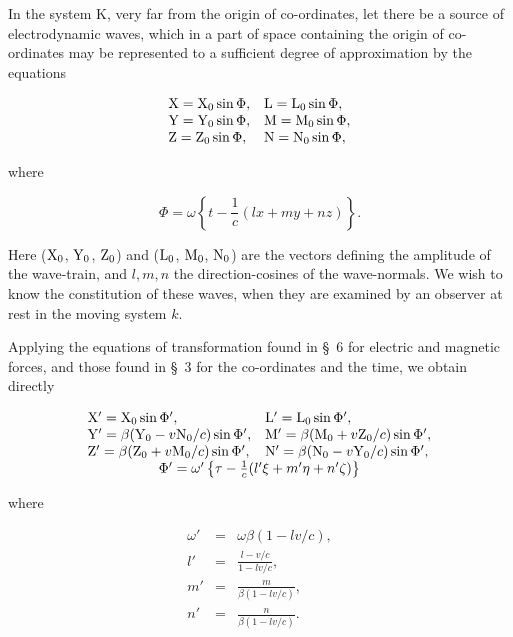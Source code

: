\documentclass{article}
\newcommand{\ic}{\frac{1}{c}}
\begin{document}
In the system K, very far from the origin of co-ordinates, let there
be a source of electrodynamic waves, which in a part of space
containing the origin of co-ordinates may be represented to a
sufficient degree of approximation by the equations

\[
\begin{array}{ll}
{\rm X} = {\rm X}_0\sin\Phi, & {\rm L} = {\rm L}_0\sin\Phi, \\
{\rm Y} = {\rm Y}_0\sin\Phi, & {\rm M} = {\rm M}_0\sin\Phi, \\
{\rm Z} = {\rm Z}_0\sin\Phi, & {\rm N} = {\rm N}_0\sin\Phi, \\
\end{array}
\]

\noindent
where

\[
\Phi=\omega\left\{t-\ic(lx+my+nz)\right\}.
\]

\noindent
Here (${\rm X}_0$, ${\rm Y}_0$, ${\rm Z}_0$)
and (${\rm L}_0$, ${\rm M}_0$, ${\rm N}_0$) are the vectors defining the
amplitude of the wave-train, and $l, m, n$ the direction-cosines of the
wave-normals.  We wish to know the constitution of these waves, when
they are examined by an observer at rest in the moving system $k$.

Applying the equations of transformation found in \S\ 6 for electric and
magnetic forces, and those found in \S\ 3 for the co-ordinates and the
time, we obtain directly

\[
\begin{array}{ll}
{\rm X'} = {\rm X}_0\sin\Phi', & {\rm L'} = {\rm L}_0\sin\Phi', \\
{\rm Y'} = \beta({\rm Y}_0-v{\rm N}_0/c)\sin\Phi', & {\rm M'} = \beta({\rm M}_0+v{\rm Z}_0/c)\sin\Phi', \\
{\rm Z'} = \beta({\rm Z}_0+v{\rm M}_0/c)\sin\Phi', & {\rm N'} = \beta({\rm N}_0-v{\rm Y}_0/c)\sin\Phi', \\
\multicolumn{2}{c}{\Phi'= \omega'\left\{\tau-\ic(l'\xi+m'\eta+n'\zeta)\right\}} \\
\end{array}
\]

\noindent
where

\begin{eqnarray*}
\omega' & = & \omega\beta(1-lv/c), \\
l' & = & \frac{l-v/c}{1 - lv/c}, \\
m' & = & \frac{m}{\beta(1-lv/c)}, \\
n' & = & \frac{n}{\beta(1-lv/c)}. \\
\end{eqnarray*}
\end{document}
